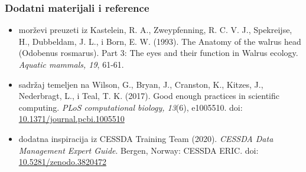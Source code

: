 \documentclass[aspectratio=169]{beamer}
\newenvironment{noheadline}{
    \setbeamertemplate{headline}{}
}{}
\begin{document}
\begin{noheadline}
    \begin{frame}
        \frametitle{Dodatni materijali i reference}

        \fontsize{10}{12}\selectfont

        \begin{itemize}
            \setlength{\itemsep}{2em}
            
            \item morževi preuzeti iz Kastelein, R. A., Zweypfenning, R. C. V.
                J., Spekreijse, H., Dubbeldam, J. L., i Born, E. W. (1993). The
                Anatomy of the walrus head (Odobenus rosmarus). Part 3: The eyes
                and their function in Walrus ecology. \textit{Aquatic mammals, 19},
                61-61.

            \item sadržaj temeljen na Wilson, G., Bryan, J., Cranston, K.,
                Kitzes, J., Nederbragt, L., i Teal, T. K. (2017). Good enough
                practices in scientific computing. \textit{PLoS computational biology,
                13}(6), e1005510. doi: \url{10.1371/journal.pcbi.1005510}

            \item dodatna inspiracija iz CESSDA Training Team (2020). \textit{CESSDA
                Data Management Expert Guide}. Bergen, Norway: CESSDA ERIC. doi:
                \url{10.5281/zenodo.3820472}
            
        \end{itemize}
    \end{frame}
\end{noheadline}
\end{document}
